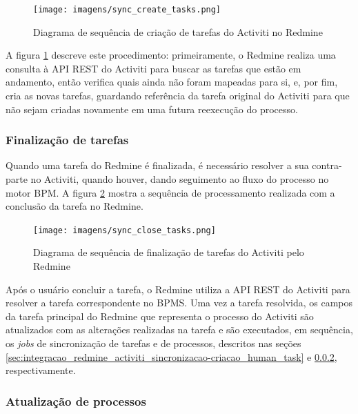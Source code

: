 \begin{figure}[H]
\centering
\texttt{[image: imagens/sync\_create\_tasks.png]}
\caption{Diagrama de sequência de criação de tarefas do Activiti no Redmine}
\label{fig:sync_bpm_tasks}
\end{figure}

A figura \ref{fig:sync_bpm_tasks} descreve este procedimento: primeiramente, o Redmine realiza uma consulta à API REST do Activiti para buscar as tarefas que estão em andamento, então verifica quais ainda não foram mapeadas para si, e, por fim, cria as novas tarefas, guardando referência da tarefa original do Activiti para que não sejam criadas novamente em uma futura reexecução do processo.

\subsubsection{Finalização de tarefas}\label{sec:integracao_redmine_activiti_sincronizacao-finalizacao_human_task}

Quando uma tarefa do Redmine é finalizada, é necessário resolver a sua contra-parte no Activiti, quando houver, dando seguimento ao fluxo do processo no motor BPM. A figura \ref{fig:close_bpm_tasks} mostra a sequência de processamento realizada com a conclusão da tarefa no Redmine.

\begin{figure}[H]
\centering
\texttt{[image: imagens/sync\_close\_tasks.png]}
\caption{Diagrama de sequência de finalização de tarefas do Activiti pelo Redmine}
\label{fig:close_bpm_tasks}
\end{figure}

Após o usuário concluir a tarefa, o Redmine utiliza a API REST do Activiti para resolver a tarefa correspondente no BPMS. Uma vez a tarefa resolvida, os campos da tarefa principal do Redmine que representa o processo do Activiti são atualizados com as alterações realizadas na tarefa e são executados, em sequência, os \textit{jobs} de sincronização de tarefas e de processos, descritos nas seções \ref{sec:integracao_redmine_activiti_sincronizacao-criacao_human_task} e \ref{sec:integracao_redmine_activiti_sincronizacao-status_processo}, respectivamente.

\subsubsection{Atualização de processos}\label{sec:integracao_redmine_activiti_sincronizacao-status_processo}

